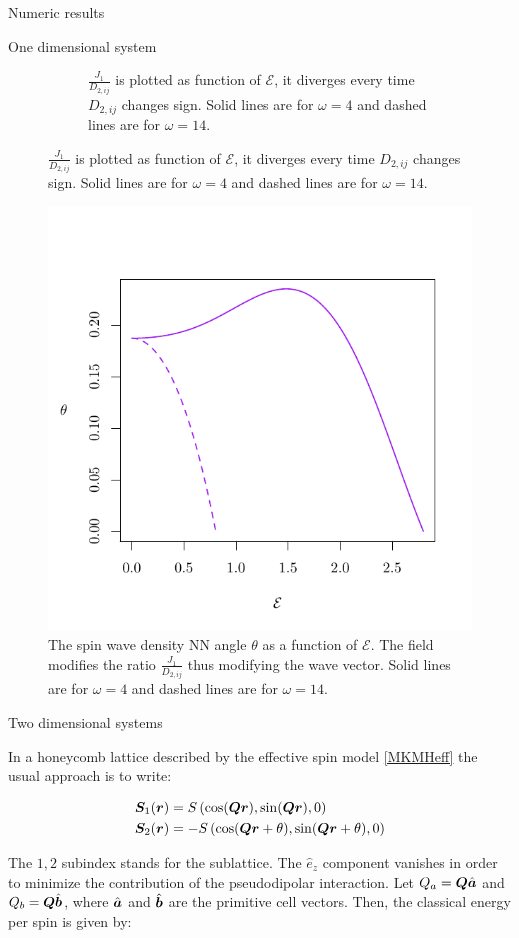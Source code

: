 \begin{section}{Numeric results}
\begin{subsection}{One dimensional system}
\begin{figure}
\begin{subfigure}{.45\textwidth}
  \caption{$\frac{J_{1}}{D_{2,ij}}$ is plotted as function of $\mathcal{E}$, it diverges every time $D_{2,ij}$ changes sign. Solid lines are for $\omega = 4$ and dashed lines are for $\omega = 14$.}
  \label{Fig3.1:ratio}
\end{subfigure}
\label{Fig3.1}
\end{figure}

\begin{figure}
\centering
  \includegraphics[width=0.5\linewidth]{Figures/theta.pdf}
  \caption{The spin wave density NN angle $\theta$ as a function of $\mathcal{E}$. The field modifies the ratio $\frac{J_{1}}{D_{2,ij}}$ thus modifying the wave vector. Solid lines are for $\omega = 4$ and dashed lines are for $\omega = 14$.}
\label{Fig3.2}
\end{figure}

\end{subsection}

\begin{subsection}{Two dimensional systems}
 
In a honeycomb lattice described by the effective spin model \ref{MKMHeff} the usual approach is to write:

\begin{align}
\boldsymbol{S}_1(\boldsymbol{r}) &= S\left( \cos(\boldsymbol{Q}\boldsymbol{r}), \sin(\boldsymbol{Q}\boldsymbol{r}), 0 \right) \\
\boldsymbol{S}_2(\boldsymbol{r}) &= -S\left( \cos(\boldsymbol{Q}\boldsymbol{r} + \theta), \sin(\boldsymbol{Q}\boldsymbol{r} + \theta), 0 \right)
\end{align}

The $1, 2$ subindex stands for the sublattice. The $\hat{e}_z$ component vanishes in order to minimize the contribution of the pseudodipolar interaction. Let $Q_a = \boldsymbol{Q}\hat{\boldsymbol{a}}$ and $Q_b = \boldsymbol{Q}\hat{\boldsymbol{b}}$, where $\hat{\boldsymbol{a}}$ and $\hat{\boldsymbol{b}}$ are the primitive cell vectors. Then, the classical energy per spin is given by:


\end{subsection}
\end{section}
